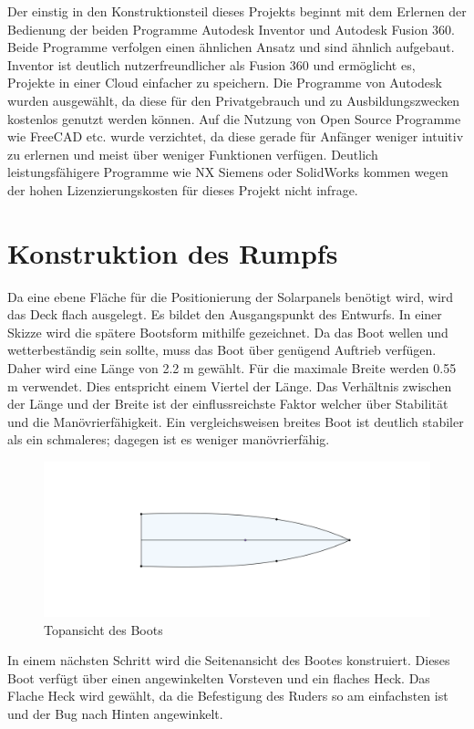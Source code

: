Der einstig in den Konstruktionsteil dieses Projekts beginnt mit dem Erlernen der Bedienung der beiden Programme Autodesk Inventor und Autodesk Fusion 360. Beide Programme verfolgen einen ähnlichen Ansatz und sind ähnlich aufgebaut. Inventor ist deutlich nutzerfreundlicher als Fusion 360 und ermöglicht es, Projekte in einer Cloud einfacher zu speichern. Die Programme von Autodesk wurden ausgewählt, da diese für den Privatgebrauch und zu Ausbildungszwecken kostenlos genutzt werden können. Auf die Nutzung von Open Source Programme wie FreeCAD etc. wurde verzichtet, da diese gerade für Anfänger weniger intuitiv zu erlernen und meist über weniger Funktionen verfügen. Deutlich leistungsfähigere Programme wie NX Siemens oder SolidWorks kommen wegen der hohen Lizenzierungskosten für dieses Projekt nicht infrage. 

\section{Konstruktion des Rumpfs}
Da eine ebene Fläche für die Positionierung der Solarpanels benötigt wird, wird das Deck flach ausgelegt. Es bildet den Ausgangspunkt des Entwurfs. In einer Skizze wird die spätere Bootsform mithilfe gezeichnet. Da das Boot wellen und wetterbeständig sein sollte, muss das Boot über genügend Auftrieb verfügen. Daher wird eine Länge von 2.2 m gewählt.
Für die maximale Breite werden 0.55 m verwendet. Dies entspricht einem Viertel der Länge. Das Verhältnis zwischen der Länge und der Breite ist der einflussreichste Faktor welcher über Stabilität und die Manövrierfähigkeit. Ein vergleichsweisen breites Boot ist deutlich stabiler als ein schmaleres; dagegen ist es weniger manövrierfähig. \cite{Seemannschaft}
\begin{figure}[H]
    \centering
    \includegraphics[width=0.75\linewidth]{assets/boot sketch top.png}
    \caption{Topansicht des Boots}
   
\end{figure}
In einem nächsten Schritt wird die Seitenansicht des Bootes konstruiert. Dieses Boot verfügt über einen angewinkelten Vorsteven und ein flaches Heck. Das Flache Heck wird gewählt, da die Befestigung des Ruders so am einfachsten ist und der Bug nach Hinten angewinkelt.

